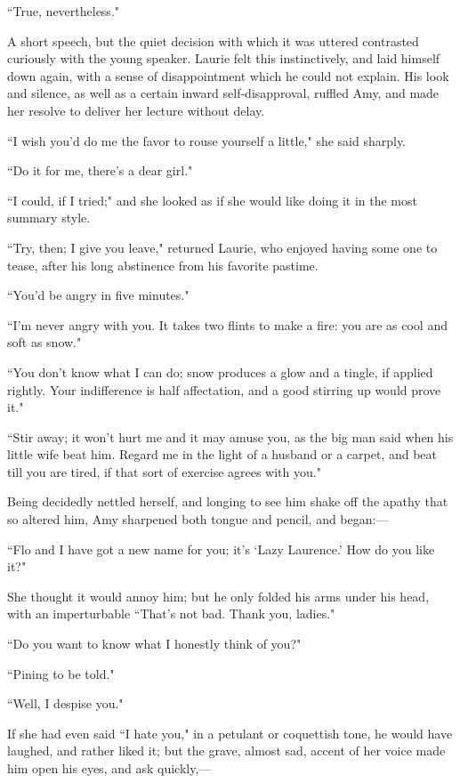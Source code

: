 ``True, nevertheless."

A short speech, but the quiet decision with which it was uttered
contrasted curiously with the young speaker. Laurie felt this
instinctively, and laid himself down again, with a sense of
disappointment which he could not explain. His look and silence, as well
as a certain inward self-disapproval, ruffled Amy, and made her resolve
to deliver her lecture without delay.

``I wish you'd do me the favor to rouse yourself a
little," she said sharply.

``Do it for me, there's a dear girl."

``I could, if I tried;" and she looked as if she would like doing it in
the most summary style.

``Try, then; I give you leave," returned Laurie, who enjoyed having some
one to tease, after his long abstinence from his favorite pastime.

``You'd be angry in five minutes."

``I'm never angry with you. It takes two flints to make a
fire: you are as cool and soft as snow."

``You don't know what I can do; snow produces a glow and
a tingle, if applied rightly. Your indifference is half affectation, and
a good stirring up would prove it."

``Stir away; it won't hurt me and it may amuse you, as
the big man said when his little wife beat him. Regard me in the light
of a husband or a carpet, and beat till you are tired, if that sort of
exercise agrees with you."

Being decidedly nettled herself, and longing to see him shake off the
apathy that so altered him, Amy sharpened both tongue and pencil, and
began:---

``Flo and I have got a new name for you; it's
`Lazy Laurence.' How do you like it?"

She thought it would annoy him; but he only folded his arms under his
head, with an imperturbable ``That's not bad. Thank you,
ladies."

``Do you want to know what I honestly think of you?"

``Pining to be told."

``Well, I despise you."

If she had even said ``I hate you," in a petulant or coquettish tone, he
would have laughed, and rather liked it; but the grave, almost sad,
accent of her voice made him open his eyes, and ask quickly,---

